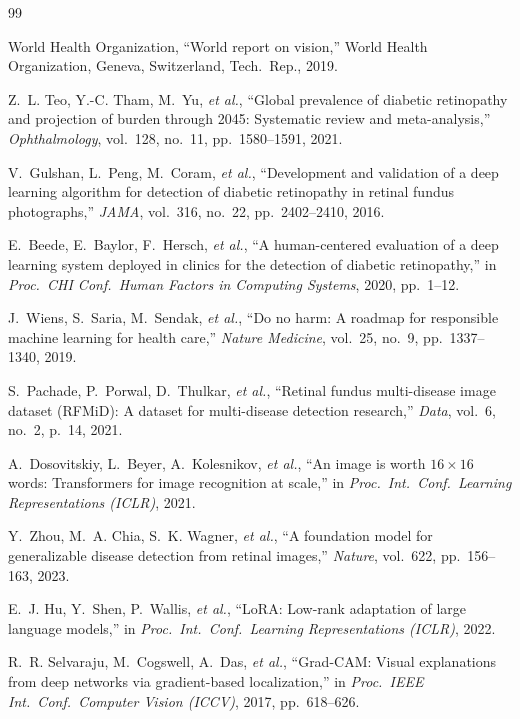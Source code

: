 \documentclass[11pt]{IEEEtran}
\begin{document}
\footnotesize
\begin{thebibliography}{99}

 World Health Organization, ``World report on vision,'' World Health
Organization, Geneva, Switzerland, Tech.\ Rep., 2019.

 Z.~L. Teo, Y.-C. Tham, M.~Yu, \emph{et al.},
``Global prevalence of diabetic retinopathy and projection of burden through 2045: Systematic
review and meta-analysis,'' \emph{Ophthalmology}, vol.~128, no.~11, pp.~1580--1591, 2021.

 V.~Gulshan, L.~Peng, M.~Coram, \emph{et al.}, ``Development and validation of a deep learning algorithm for detection of diabetic
retinopathy in retinal fundus photographs,'' \emph{JAMA}, vol.~316, no.~22, pp.~2402--2410, 2016.

 E.~Beede, E.~Baylor, F.~Hersch, \emph{et al.}, ``A human-centered evaluation of a deep learning system deployed in clinics for
the detection of diabetic retinopathy,'' in \emph{Proc.\ CHI Conf.\ Human Factors in Computing
Systems}, 2020, pp.~1--12.

 J.~Wiens, S.~Saria, M.~Sendak, \emph{et al.}, ``Do no harm: A roadmap for responsible machine learning for health care,''
\emph{Nature Medicine}, vol.~25, no.~9, pp.~1337--1340, 2019.

 S.~Pachade, P.~Porwal, D.~Thulkar, \emph{et al.}, ``Retinal fundus multi-disease image dataset
(RFMiD): A dataset for multi-disease detection research,'' \emph{Data}, vol.~6, no.~2, p.~14,
2021.

 A.~Dosovitskiy, L.~Beyer, A.~Kolesnikov, \emph{et al.}, ``An image is worth $16\times16$ words: Transformers for image
recognition at scale,'' in \emph{Proc.\ Int.\ Conf.\ Learning Representations (ICLR)}, 2021.

 Y.~Zhou, M.~A. Chia, S.~K. Wagner, \emph{et al.}, ``A foundation model for generalizable disease detection from retinal
images,'' \emph{Nature}, vol.~622, pp.~156--163, 2023.

 E.~J. Hu, Y.~Shen, P.~Wallis, \emph{et al.}, ``LoRA: Low-rank adaptation of large language models,'' in \emph{Proc.\ Int.\ Conf.\
Learning Representations (ICLR)}, 2022.

 R.~R. Selvaraju, M.~Cogswell, A.~Das, \emph{et al.},
``Grad-CAM: Visual explanations from deep networks via gradient-based localization,'' in
\emph{Proc.\ IEEE Int.\ Conf.\ Computer Vision (ICCV)}, 2017, pp.~618--626.


\end{thebibliography}
\end{document}
